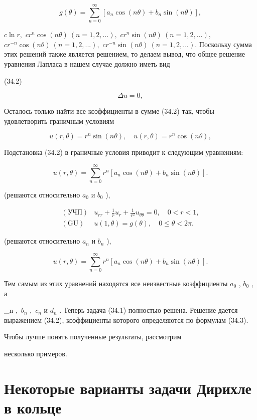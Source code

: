 \documentclass[
  ukrainian,
]{article}
\begin{document}
\[
g(\theta) = \sum_{n=0}^{\infty} [a_n \cos(n\theta) + b_n \sin(n\theta)],
\]

\(c \ln r,\) \(cr^n \cos(n\theta) \ (n = 1, 2, ...),\)
\(cr^n \sin(n\theta) \ (n = 1, 2, ...),\)
\(cr^{-n} \cos(n\theta) \ (n = 1, 2, ...),\)
\(cr^{-n} \sin(n\theta) \ (n = 1, 2, ...).\) Поскольку сумма этих
решений также является решением, то делаем вывод, что общее решение
уравнения Лапласа в нашем случае должно иметь вид

(34.2)

\[
\Delta u = 0,
\]

Осталось только найти все коэффициенты в сумме (34.2) так, чтобы
удовлетворить граничным условиям

\[
u(r, \theta) = r^n \sin(n\theta), \quad u(r, \theta) = r^n \cos(n\theta),
\]

Подстановка (34.2) в граничные условия приводит к следующим уравнениям:

\[
u(r, \theta) = \sum_{n=0}^{\infty} r^n [a_n \cos(n\theta) + b_n \sin(n\theta)].
\]

(решаются относительно \(a_0\) и \(b_0\) ),

\[
\begin{aligned} (\text{УЧП}) & u_{rr} + \frac{1}{r} u_r + \frac{1}{r^2} u_{\theta\theta} = 0, \quad 0 < r < 1, \\ (\text{GU}) & u(1, \theta) = g(\theta), \quad 0 \leqslant \theta < 2\pi. \end{aligned}
\]

(решаются относительно \(a_n\) и \(b_n\) ),

\[
u(r, \theta) = \sum_{n=0}^{\infty} r^n \left[ a_n \cos(n\theta) + b_n \sin(n\theta) \right].
\]

Тем самым из этих уравнений находятся все неизвестные коэффициенты
\(a_0\) , \(b_0\) , а

\_n \(,\) \(b_n\) \(,\) \(c_n\) \(и\) \(d_n\) . Теперь задача (34.1)
полностью решена. Решение дается выражением (34.2), коэффициенты
которого определяются по формулам (34.3).

Чтобы лучше понять полученные результаты, рассмотрим

несколько примеров.

\section{Некоторые варианты задачи Дирихле в
кольце}\label{ux43dux435ux43aux43eux442ux43eux440ux44bux435-ux432ux430ux440ux438ux430ux43dux442ux44b-ux437ux430ux434ux430ux447ux438-ux434ux438ux440ux438ux445ux43bux435-ux432-ux43aux43eux43bux44cux446ux435-1}
\end{document}
